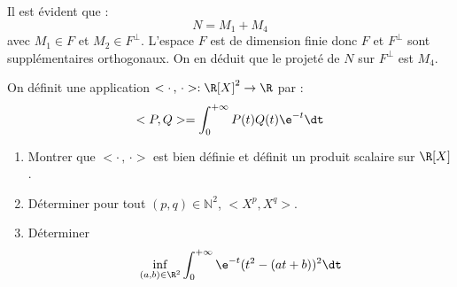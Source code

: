 \documentclass[a4paper,10pt]{report}
\begin{document}
\begin{enumerate}
\medskip

\noindent Il est évident que :
$$ N= M_1+M_4$$
avec $M_1 \in F$ et $M_2 \in F^{\perp}$. L'espace $F$ est de dimension finie donc $F$ et $F^{\perp}$ sont supplémentaires orthogonaux. On en déduit que le projeté de $N$ sur $F^{\perp}$ est $M_4$.
\end{enumerate}

\begin{Exercice}{} On définit une application $< \cdot \, , \, \cdot> : \R[X]^2 \rightarrow \R$ par :
  \[
 <P,Q> = \int_{0}^{ + \infty} P(t)Q(t)\e^{ - t} \dt
  \]
  \begin{enumerate}
  \item Montrer que $< \cdot \, , \, \cdot>$ est bien définie et définit un produit scalaire sur $\R[X]$.
  \item Déterminer pour tout $(p,q) \in \mathbb{N}^2$, $<X^{p} ,X^{q}>$.
  \item Déterminer
    \[
    \inf_{(a,b) \in \R^{2}} \int_{0}^{ + \infty} \e^{ - t}(t^{2} - (at + b))^{2} \dt
    \]
  \end{enumerate}
\end{Exercice}

\corr 
\end{document}
